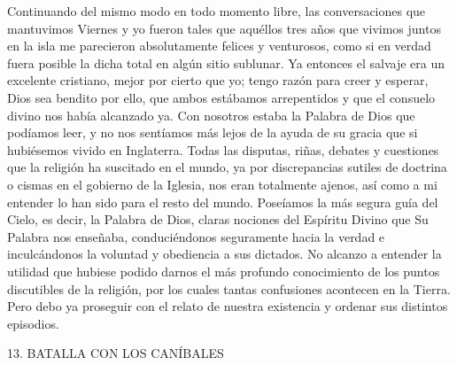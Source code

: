 \documentclass{novela}
\begin{document}
    Continuando del mismo modo en todo momento libre, las conversaciones que mantuvimos Viernes y yo fueron tales que aquéllos tres años que vivimos juntos en la isla me parecieron absolutamente felices y venturosos, como si en verdad fuera posible la dicha total en algún sitio sublunar. Ya entonces el salvaje era un excelente cristiano, mejor por cierto que yo; tengo razón para creer y esperar, Dios sea bendito por ello, que ambos estábamos arrepentidos y que el consuelo divino nos había alcanzado ya. Con nosotros estaba la Palabra de Dios que podíamos leer, y no nos sentíamos más lejos de la ayuda de su gracia que si hubiésemos vivido en Inglaterra.
    Todas las disputas, riñas, debates y cuestiones que la religión ha suscitado en el mundo, ya por discrepancias sutiles de doctrina o cismas en el gobierno de la Iglesia, nos eran totalmente ajenos, así como a mi entender lo han sido para el resto del mundo. Poseíamos la más segura guía del Cielo, es decir, la Palabra de Dios, claras nociones del Espíritu Divino que Su Palabra nos enseñaba, conduciéndonos seguramente hacia la verdad e inculcándonos la voluntad y obediencia a sus dictados. No alcanzo a entender la utilidad que hubiese podido darnos el más profundo conocimiento de los puntos discutibles de la religión, por los cuales tantas confusiones acontecen en la Tierra. Pero debo ya proseguir con el relato de nuestra existencia y ordenar sus distintos episodios.





    13. BATALLA CON LOS CANÍBALES
\end{document}
